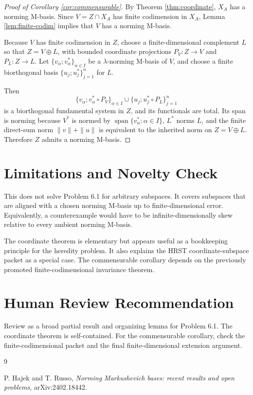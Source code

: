 \documentclass[11pt]{article}
\newcommand{\spn}{\operatorname{span}}
\begin{document}
\begin{proof}[Proof of Corollary \ref{cor:commensurable}]
By Theorem \ref{thm:coordinate}, $X_A$ has a norming M-basis. Since
$V=Z\cap X_A$ has finite codimension in $X_A$, Lemma \ref{lem:finite-codim}
implies that $V$ has a norming M-basis.

Because $V$ has finite codimension in $Z$, choose a finite-dimensional
complement $L$ so that $Z=V\oplus L$, with bounded coordinate projections
$P_V:Z\to V$ and $P_L:Z\to L$. Let
$\{v_\alpha;v_\alpha^*\}_{\alpha\in I}$ be a $\lambda$-norming M-basis of
$V$, and choose a finite biorthogonal basis
$\{u_j;u_j^*\}_{j=1}^n$ for $L$.

Then
\[
    \{v_\alpha;v_\alpha^*\circ P_V\}_{\alpha\in I}
    \cup
    \{u_j;u_j^*\circ P_L\}_{j=1}^n
\]
is a biorthogonal fundamental system in $Z$, and its functionals are total.
Its span is norming because $V^*$ is normed by
$\spn\{v_\alpha^*:\alpha\in I\}$, $L^*$ norms $L$, and the finite direct-sum
norm $\|v\|+\|u\|$ is equivalent to the inherited norm on $Z=V\oplus L$.
Therefore $Z$ admits a norming M-basis.
\end{proof}

\section*{Limitations and Novelty Check}

This does not solve Problem 6.1 for arbitrary subspaces. It covers subspaces
that are aligned with a chosen norming M-basis up to finite-dimensional error.
Equivalently, a counterexample would have to be infinite-dimensionally skew
relative to every ambient norming M-basis.

The coordinate theorem is elementary but appears useful as a bookkeeping
principle for the heredity problem. It also explains the HRST
coordinate-subspace packet as a special case. The commensurable corollary
depends on the previously promoted finite-codimensional invariance theorem.

\section*{Human Review Recommendation}

Review as a broad partial result and organizing lemma for Problem 6.1. The
coordinate theorem is self-contained. For the commensurable corollary, check
the finite-codimensional packet and the final finite-dimensional extension
argument.

\begin{thebibliography}{9}

P. Hajek and T. Russo,
\emph{Norming Markushevich bases: recent results and open problems},
arXiv:2402.18442.

\end{thebibliography}
\end{document}
